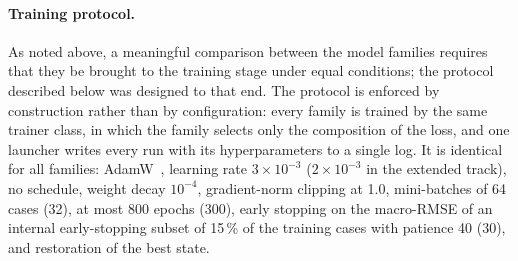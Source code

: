 \documentclass[subscriptcorrection,upint,varvw,barcolor=Goldenrod3,mathalfa=cal=euler,balance,hyphenate,french,pdf-a]{asmejour} %
\begin{document}
\paragraph{Training protocol.}
As noted above, a meaningful comparison between the model families requires
that they be brought to the training stage under equal conditions; the protocol
described below was designed to that end.
The protocol is enforced by construction rather than by configuration: every
family is trained by the same trainer class, in which the family selects only the
composition of the loss, and one launcher writes every run with its
hyperparameters to a single log.
It is identical for all families: AdamW~\citep{loshchilov2019adamw}, learning rate
$3\times10^{-3}$ ($2\times10^{-3}$ in the extended track), no schedule, weight
decay $10^{-4}$, gradient-norm clipping at 1.0, mini-batches of 64 cases (32),
at most 800 epochs (300), early stopping on the macro-RMSE of an internal
early-stopping subset of 15\,\% of the training cases with patience 40 (30), and %
restoration of the best state.
\end{document}
